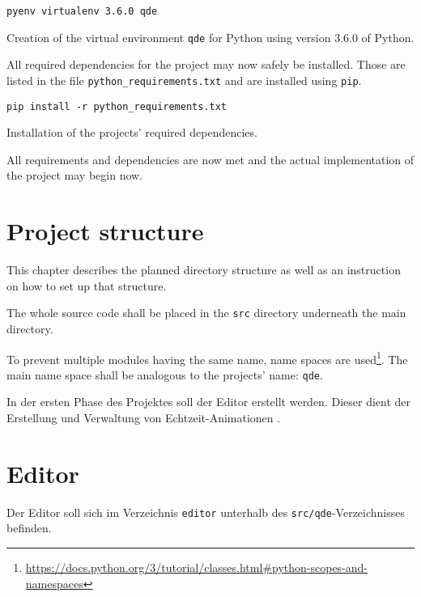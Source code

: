 \documentclass[10pt, openright, notitlepage]{scrreprt}
\begin{document}
\begin{listing}[H]
\begin{verbatim}
pyenv virtualenv 3.6.0 qde
\end{verbatim}
\caption{\label{org4e3f2a3}
Creation of the virtual environment \texttt{qde} for Python using version 3.6.0 of Python.}
\end{listing}

All required dependencies for the project may now safely be installed. Those are
listed in the file \texttt{python\_requirements.txt} and are installed using \texttt{pip}.

\begin{listing}[H]
\begin{verbatim}
pip install -r python_requirements.txt
\end{verbatim}
\caption{\label{org9a3c9e7}
Installation of the projects' required dependencies.}
\end{listing}

All requirements and dependencies are now met and the actual implementation of
the project may begin now.

\section{Project structure}
\label{sec:orgdf6e0d0}

This chapter describes the planned directory structure as well as an instruction
on how to set up that structure.

The whole source code shall be placed in the \texttt{src} directory underneath the main
directory.

To prevent multiple modules having the same name, name spaces are
used\footnote{\url{https://docs.python.org/3/tutorial/classes.html\#python-scopes-and-namespaces}}.
The main name space shall be analogous to the projects' name: \texttt{qde}.

In der ersten Phase des Projektes soll der Editor erstellt werden. Dieser dient
der Erstellung und Verwaltung von Echtzeit-Animationen \cite[S. 29]{osterwalder_qde_2016}.

\section{Editor}
\label{sec:orgd87394d}

Der Editor soll sich im Verzeichnis \texttt{editor} unterhalb des \texttt{src/qde}-Verzeichnisses
befinden.
\end{document}

